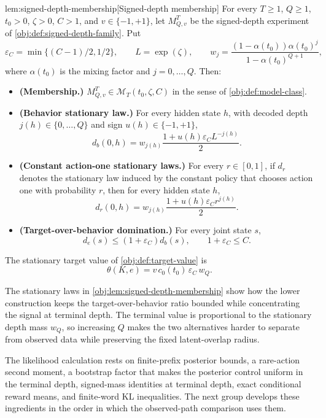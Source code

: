\begin{lemmav}{lem:signed-depth-membership}[Signed-depth membership]
For every \(T\ge 1\), \(Q\ge 1\), \(t_0>0\), \(\zeta>0\), \(C>1\), and \(v\in\{-1,+1\}\), let \(M_{Q,v}^T\) be the signed-depth experiment of \cref{obj:def:signed-depth-family}.  Put
\[
\varepsilon_C=\min\{(C-1)/2,1/2\},
\qquad
L=\exp(\zeta),
\qquad
w_j=\frac{(1-\alpha(t_0))\alpha(t_0)^j}{1-\alpha(t_0)^{Q+1}},
\]
where \(\alpha(t_0)\) is the mixing factor and \(j=0,\ldots,Q\).  Then:
\begin{itemize}
\item \textbf{(Membership.)} \(M_{Q,v}^T\in \mathcal M_T(t_0,\zeta,C)\) in the sense of \cref{obj:def:model-class}.
\item \textbf{(Behavior stationary law.)} For every hidden state \(h\), with decoded depth \(j(h)\in\{0,\ldots,Q\}\) and sign \(u(h)\in\{-1,+1\}\),
\[
d_b(0,h)
=
w_{j(h)}
\frac{1+u(h)\varepsilon_C L^{-j(h)}}{2}.
\]
\item \textbf{(Constant action-one stationary laws.)} For every \(r\in[0,1]\), if \(d_r\) denotes the stationary law induced by the constant policy that chooses action one with probability \(r\), then for every hidden state \(h\),
\[
d_r(0,h)
=
w_{j(h)}
\frac{1+u(h)\varepsilon_C r^{j(h)}}{2}.
\]
\item \textbf{(Target-over-behavior domination.)} For every joint state \(s\),
\[
d_e(s)\le (1+\varepsilon_C)d_b(s),
\qquad
1+\varepsilon_C\le C.
\]
\end{itemize}
The stationary target value of \cref{obj:def:target-value} is
\[
\theta(K,e)
=
v\,c_0(t_0)\,\varepsilon_C\,w_Q .
\]
\end{lemmav}

The stationary laws in \cref{obj:lem:signed-depth-membership} show how the lower construction keeps the target-over-behavior ratio bounded while concentrating the signal at terminal depth. The terminal value is proportional to the stationary depth mass \(w_Q\), so increasing \(Q\) makes the two alternatives harder to separate from observed data while preserving the fixed latent-overlap radius.

The likelihood calculation rests on finite-prefix posterior bounds, a rare-action second moment, a bootstrap factor that makes the posterior control uniform in the terminal depth, signed-mass identities at terminal depth, exact conditional reward means, and finite-word KL inequalities. The next group develops these ingredients in the order in which the observed-path comparison uses them.

